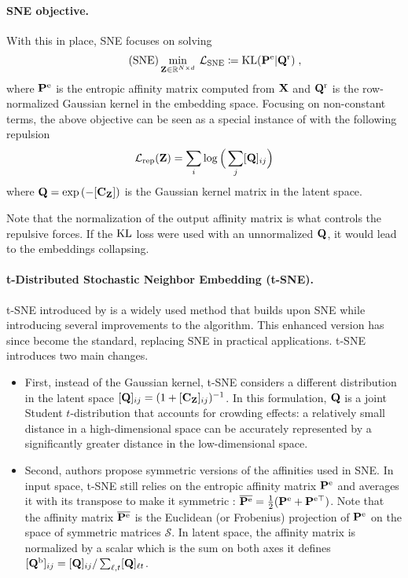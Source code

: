 \paragraph{SNE objective.}
With this in place, SNE focuses on solving
\begin{align}\label{eq:SNE_pb}\tag{SNE}
    \min_{{\mathbf{Z}} \in \mathbb{R}^{N \times d}} \: \mathcal{L}_{\mathrm{SNE}} \coloneqq \operatorname{KL}({\mathbf{P}}^{\mathrm{e}} | {\mathbf{Q}}^{\mathrm{r}}) \;,
\end{align}
where ${\mathbf{P}}^{\mathrm{e}}$ is the entropic affinity matrix computed from ${\mathbf{X}}$ and ${\mathbf{Q}}^{\mathrm{r}}$ is the row-normalized Gaussian kernel in the embedding space.
Focusing on non-constant terms, the above objective can be seen as a special instance of  with the following repulsion
\begin{align}
    \mathcal{L}_{\mathrm{rep}}({\mathbf{Z}}) = \sum_{i} \log \Big(\sum_j [{\mathbf{Q}}]_{ij} \Big)
\end{align}
where ${\mathbf{Q}} = \exp{(-[{\mathbf{C}}_{{\mathbf{Z}}}])}$ is the Gaussian kernel matrix in the latent space.

\begin{remark}\label{rem:norm_as_repulsion}
    Note that the normalization of the output affinity matrix is what controls the repulsive forces. If the $\operatorname{KL}$ loss were used with an unnormalized ${\mathbf{Q}}$, it would lead to the embeddings collapsing.
\end{remark}

\paragraph{t-Distributed Stochastic Neighbor Embedding (t-SNE).} t-SNE introduced by \citet{van2008visualizing} is a widely used method that builds upon SNE while introducing several improvements to the algorithm. This enhanced version has since become the standard, replacing SNE in practical applications. t-SNE introduces two main changes. 
\begin{itemize}
    \item First, instead of the Gaussian kernel, t-SNE considers a different distribution in the latent space $[{\mathbf{Q}}]_{ij} = (1 + [\mathbf{C}_{\mathbf{Z}}]_{ij})^{-1}$. In this formulation, ${\mathbf{Q}}$ is a joint Student $t$-distribution that accounts for crowding effects: a relatively small
    distance in a high-dimensional space can be accurately represented by a
    significantly greater distance in the low-dimensional space. 
    \item Second, authors propose symmetric versions of the affinities used in SNE. In input space, t-SNE still relies on the entropic affinity matrix ${\mathbf{P}}^{\mathrm{e}}$ and averages it with its transpose to make it symmetric : 
    $\overline{{\mathbf{P}}^{\mathrm{e}}} = \frac{1}{2}({\mathbf{P}}^{\mathrm{e}} + {\mathbf{P}}^{\mathrm{e} \top})$. Note that the affinity matrix $\overline{{\mathbf{P}}^{\mathrm{e}}}$ is the Euclidean (or Frobenius) projection of ${\mathbf{P}}^{\mathrm{e}}$ on the space of symmetric matrices $\mathcal{S}$. In latent space, the affinity matrix is normalized by a scalar which is the sum on both axes \ie it defines $[{\mathbf{Q}}^{\mathrm{b}}]_{ij} = [{\mathbf{Q}}]_{ij} /\sum_{\ell,t}[{\mathbf{Q}}]_{\ell t}$.
\end{itemize}

